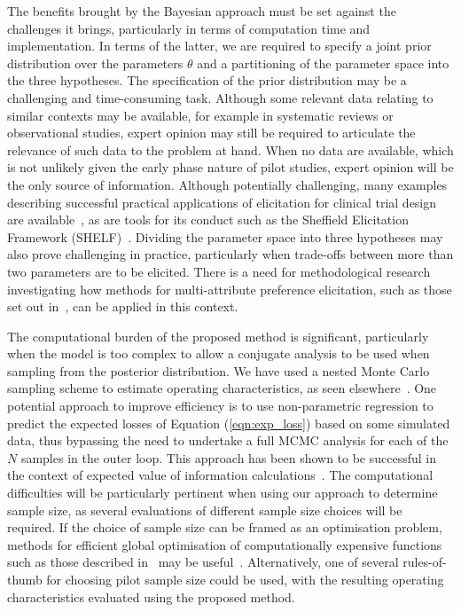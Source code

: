 \documentclass[AMA,STIX1COL]{WileyNJD-v2}
\begin{document}
The benefits brought by the Bayesian approach must be set against the challenges it brings, particularly in terms of computation time and implementation. In terms of the latter, we are required to specify a joint prior distribution over the parameters $\theta$ and a partitioning of the parameter space into the three hypotheses. The specification of the prior distribution may be a challenging and time-consuming task. Although some relevant data relating to similar contexts may be available, for example in systematic reviews or observational studies, expert opinion may still be required to articulate the relevance of such data to the problem at hand. When no data are available, which is not unlikely given the early phase nature of pilot studies, expert opinion will be the only source of information. Although potentially challenging, many examples describing successful practical applications of elicitation for clinical trial design are available~\cite{Walley2015, Crisp2018, Dallow2018}, as are tools for its conduct such as the Sheffield Elicitation Framework (SHELF)~\cite{OHagan2006a}. Dividing the parameter space into three hypotheses may also prove challenging in practice, particularly when trade-offs between more than two parameters are to be elicited. There is a need for methodological research investigating how methods for multi-attribute preference elicitation, such as those set out in~\cite{Keeney1976}, can be applied in this context. 

The computational burden of the proposed method is significant, particularly when the model is too complex to allow a conjugate analysis to be used when sampling from the posterior distribution. We have used a nested Monte Carlo sampling scheme to estimate operating characteristics, as seen elsewhere~\cite{Wang2002, OHagan2005, Sutton2007}. One potential approach to improve efficiency is to use non-parametric regression to predict the expected losses of Equation (\ref{eqn:exp_loss}) based on some simulated data, thus bypassing the need to undertake a full MCMC analysis for each of the $N$ samples in the outer loop. This approach has been shown to be successful in the context of expected value of information calculations~\cite{Strong2014, Strong2015}. The computational difficulties will be particularly pertinent when using our approach to determine sample size, as several evaluations of different sample size choices will be required. If the choice of sample size can be framed as an optimisation problem, methods for efficient global optimisation of computationally expensive functions such as those described in~\cite{Jones2001, Roustant2012} may be useful~\cite{Wilson2015}. Alternatively, one of several rules-of-thumb for choosing pilot sample size \cite{Lancaster2004, Julious2005, Teare2014, Whitehead2015} could be used, with the resulting operating characteristics evaluated using the proposed method.
\end{document}

